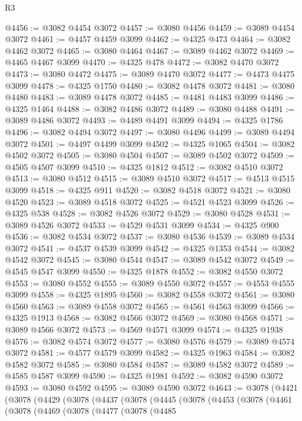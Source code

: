 \begin{lexlean}{R3}
\begin{coremodule}
@4456 := @3082 @4454 @3072
@4457 := @3080 @4456
@4459 := @3089 @4454 @3072
@4461 := @4457 @4459 @3099
@4462 := @4325 @473
@4464 := @3082 @4462 @3072
@4465 := @3080 @4464
@4467 := @3089 @4462 @3072
@4469 := @4465 @4467 @3099
@4470 := @4325 @478
@4472 := @3082 @4470 @3072
@4473 := @3080 @4472
@4475 := @3089 @4470 @3072
@4477 := @4473 @4475 @3099
@4478 := @4325 @1750
@4480 := @3082 @4478 @3072
@4481 := @3080 @4480
@4483 := @3089 @4478 @3072
@4485 := @4481 @4483 @3099
@4486 := @4325 @1464
@4488 := @3082 @4486 @3072
@4489 := @3080 @4488
@4491 := @3089 @4486 @3072
@4493 := @4489 @4491 @3099
@4494 := @4325 @1786
@4496 := @3082 @4494 @3072
@4497 := @3080 @4496
@4499 := @3089 @4494 @3072
@4501 := @4497 @4499 @3099
@4502 := @4325 @1065
@4504 := @3082 @4502 @3072
@4505 := @3080 @4504
@4507 := @3089 @4502 @3072
@4509 := @4505 @4507 @3099
@4510 := @4325 @1812
@4512 := @3082 @4510 @3072
@4513 := @3080 @4512
@4515 := @3089 @4510 @3072
@4517 := @4513 @4515 @3099
@4518 := @4325 @911
@4520 := @3082 @4518 @3072
@4521 := @3080 @4520
@4523 := @3089 @4518 @3072
@4525 := @4521 @4523 @3099
@4526 := @4325 @538
@4528 := @3082 @4526 @3072
@4529 := @3080 @4528
@4531 := @3089 @4526 @3072
@4533 := @4529 @4531 @3099
@4534 := @4325 @900
@4536 := @3082 @4534 @3072
@4537 := @3080 @4536
@4539 := @3089 @4534 @3072
@4541 := @4537 @4539 @3099
@4542 := @4325 @1353
@4544 := @3082 @4542 @3072
@4545 := @3080 @4544
@4547 := @3089 @4542 @3072
@4549 := @4545 @4547 @3099
@4550 := @4325 @1878
@4552 := @3082 @4550 @3072
@4553 := @3080 @4552
@4555 := @3089 @4550 @3072
@4557 := @4553 @4555 @3099
@4558 := @4325 @1895
@4560 := @3082 @4558 @3072
@4561 := @3080 @4560
@4563 := @3089 @4558 @3072
@4565 := @4561 @4563 @3099
@4566 := @4325 @1913
@4568 := @3082 @4566 @3072
@4569 := @3080 @4568
@4571 := @3089 @4566 @3072
@4573 := @4569 @4571 @3099
@4574 := @4325 @1938
@4576 := @3082 @4574 @3072
@4577 := @3080 @4576
@4579 := @3089 @4574 @3072
@4581 := @4577 @4579 @3099
@4582 := @4325 @1963
@4584 := @3082 @4582 @3072
@4585 := @3080 @4584
@4587 := @3089 @4582 @3072
@4589 := @4585 @4587 @3099
@4590 := @4325 @1981
@4592 := @3082 @4590 @3072
@4593 := @3080 @4592
@4595 := @3089 @4590 @3072
@4643 := @3078
    (@4421
      (@3078
        (@4429
          (@3078
            (@4437
              (@3078
                (@4445
                  (@3078
                    (@4453
                      (@3078
                        (@4461
                          (@3078
                            (@4469
                              (@3078
                                (@4477
                                  (@3078
                                    (@4485

\end{coremodule}
\end{lexlean}

